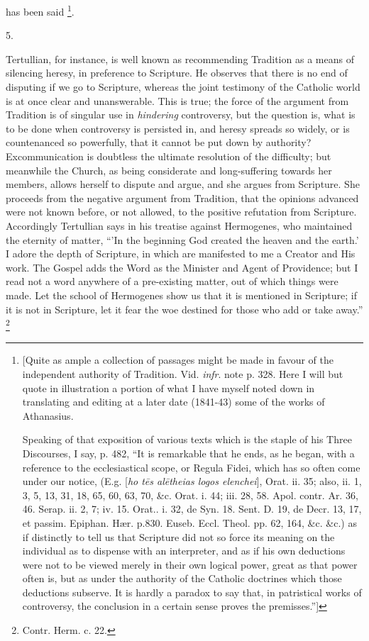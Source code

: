 has been said \footnote{[Quite as ample a collection of passages might be made in favour
of the independent authority of Tradition. Vid. \emph{infr}. note p.
328. Here I will but quote in illustration a portion of what I have
myself noted down in translating and editing at a later date (1841-43)
some of the works of Athanasius.

Speaking of that exposition of various texts which is the staple of
his Three Discourses, I say, p. 482, ``It is remarkable that he
ends, as he began, with a reference to the ecclesiastical scope, or
Regula Fidei, which has so often come under our notice, (E.g. [\emph{ho t\={e}s
al\={e}theias logos elenchei}], Orat. ii. 35; also, ii. 1, 3, 5,
13, 31, 18, 65, 60, 63, 70, \&c. Orat. i. 44; iii. 28, 58. Apol.
contr. Ar. 36, 46. Serap. ii. 2, 7; iv. 15. Orat.. i. 32, de Syn. 18.
Sent. D. 19, de Decr. 13, 17, et passim. Epiphan. Hær. p.830. Euseb.
Eccl. Theol. pp. 62, 164, \&c. \&c.) as if distinctly to tell us
that Scripture did not so force its meaning on the individual as to
dispense with an interpreter, and as if his own deductions were not to
be viewed merely in their own logical power, great as that power often
is, but as under the authority of the Catholic doctrines which those
deductions subserve. It is hardly a paradox to say that, in
patristical works of controversy, the conclusion in a certain sense
proves the premisses.'']}.

5.

Tertullian, for instance, is well known as recommending Tradition
as a means of silencing heresy, in preference to Scripture. He
observes that there is no end of disputing if we go to Scripture,
whereas the joint testimony of the Catholic world is at once clear and
unanswerable. This is true; the force of the argument from Tradition
is of singular use in \emph{hindering} controversy, but the question
is, what is to be done when controversy is persisted in, and heresy
spreads so widely, or is countenanced so powerfully, that it cannot be
put down by authority? Excommunication is doubtless the ultimate
resolution of the difficulty; but meanwhile the Church, as being
considerate and long-suffering towards her members, allows herself to
dispute and argue, and she argues from Scripture. She proceeds from
the negative argument from Tradition, that the opinions advanced were
not known before, or not allowed, to the positive refutation from
Scripture. Accordingly Tertullian says in his treatise against
Hermogenes, who maintained the eternity of matter, ``'In the
beginning God created the heaven and the earth.' I adore the depth of
Scripture, in which are manifested to me a Creator and His work. The
Gospel adds the Word as the Minister and Agent of Providence; but I
read not a word anywhere of a pre-existing matter, out of which things
were made. Let the school of Hermogenes show us that it is mentioned
in Scripture; if it is not in Scripture, let it fear the woe destined
for those who add or take away.'' \footnote{Contr. Herm. c. 22.}

